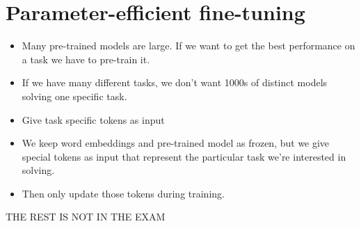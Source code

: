 \documentclass[11pt]{article}
\begin{document}
\section{Parameter-efficient fine-tuning}

\begin{minipage}[l]{.5\linewidth}
    \begin{figure}[H]
        \centering
    \end{figure}    
\end{minipage}\hfill
\begin{minipage}[r]{.48\linewidth}
    \begin{itemize}
        \item Many pre-trained models are large. If we want to get the best performance on a task we have to pre-train it.
        \item If we have many different tasks, we don't want 1000s of distinct models solving one specific task.
    \end{itemize}
\end{minipage}

\begin{minipage}[l]{.5\linewidth}
    \begin{figure}[H]
        \centering
    \end{figure}    
\end{minipage}\hfill
\begin{minipage}[r]{.48\linewidth}
    \begin{itemize}
        \item Give task specific tokens as input
        \item We keep word embeddings and pre-trained model as frozen, but we give special tokens as input that represent the particular task we're interested in solving. 
        \item Then only update those tokens during training.
    \end{itemize}
\end{minipage}

THE REST IS NOT IN THE EXAM

\end{document}
